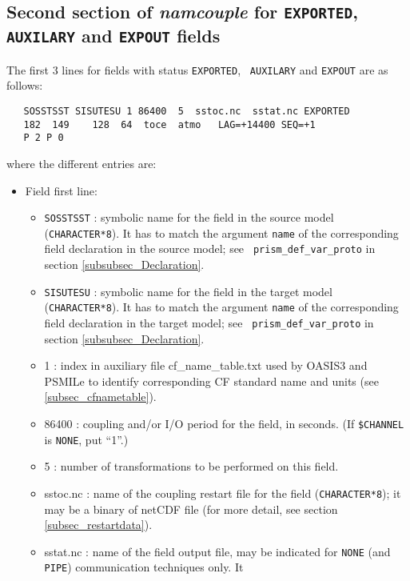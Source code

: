\subsection{Second section of {\it namcouple} for {\tt EXPORTED}, {\tt
      AUXILARY} and {\tt EXPOUT} fields}
\label{subsubsec_secondEXPORTED}

  The first 3 lines for fields with status {\tt EXPORTED}, {\tt
  AUXILARY} and {\tt EXPOUT} are as follows:
  \begin{verbatim}
   SOSSTSST SISUTESU 1 86400  5  sstoc.nc  sstat.nc EXPORTED
   182  149    128  64  toce  atmo   LAG=+14400 SEQ=+1
   P 2 P 0 
  \end{verbatim}
  where the different entries are:
    \begin{itemize}
      \item Field first line:
        \begin{itemize}
        \item {\tt SOSSTSST} : symbolic name for the field in the
              source model ({\tt CHARACTER*8}). It has to match the
              argument {\tt name} of the corresponding field
              declaration in the source model; see {\tt
              prism\_def\_var\_proto} in section
              \ref{subsubsec_Declaration}.
        \item {\tt SISUTESU} : symbolic name for the field in the
              target model ({\tt CHARACTER*8}).  It has to match the
              argument {\tt name} of the corresponding field
              declaration in the target model; see {\tt
              prism\_def\_var\_proto} in section
              \ref{subsubsec_Declaration}.
        \item 1 : index in auxiliary file cf\_name\_table.txt used by OASIS3 and PSMILe to identify corresponding CF standard name and units (see \ref{subsec_cfnametable}).
        \item 86400 : coupling and/or I/O period for the field, in
        seconds. (If {\tt \$CHANNEL} is {\tt NONE}, put ``1''.)
        \item 5 : number of transformations to be performed on this field.  
        \item sstoc.nc : name of the coupling restart file for the
  	  field ({\tt CHARACTER*8}); it may be a binary of netCDF file (for
	  more detail, see section \ref{subsec_restartdata}).
        \item sstat.nc : name of the field output file, may be indicated for
	  {\tt NONE} (and {\tt PIPE}) communication techniques only. It

\end{itemize}
\end{itemize}
